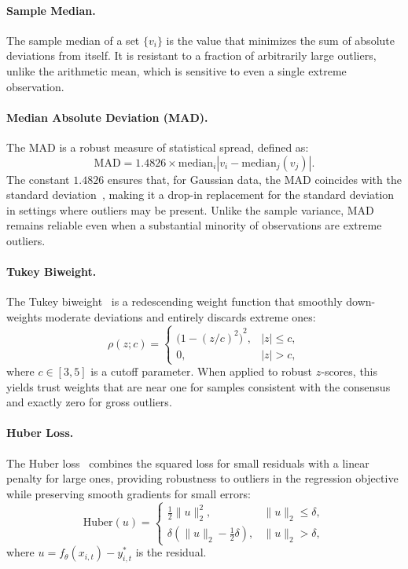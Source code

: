 \documentclass[a4paper, 10pt, conference]{ieeeconf}
\begin{document}
\paragraph{Sample Median.}
The sample median of a set $\{v_i\}$ is the value that minimizes the sum of absolute deviations from itself.
It is resistant to a fraction of arbitrarily large outliers, unlike the arithmetic mean, which is sensitive to even a single extreme observation.

\paragraph{Median Absolute Deviation (MAD).}
The MAD is a robust measure of statistical spread, defined as:
\begin{equation}
    \mathrm{MAD} = 1.4826 \times \mathrm{median}_i \left|v_i - \mathrm{median}_j(v_j)\right|.
\end{equation}
The constant $1.4826$ ensures that, for Gaussian data, the MAD coincides with the standard deviation~\cite{rousseeuw1993mad}, making it a drop-in replacement for the standard deviation in settings where outliers may be present.
Unlike the sample variance, MAD remains reliable even when a substantial minority of observations are extreme outliers.

\paragraph{Tukey Biweight.}
The Tukey biweight~\cite{kafadar1983biweight} is a redescending weight function that smoothly down-weights moderate deviations and entirely discards extreme ones:
\begin{equation}
    \rho(z; c) =
    \begin{cases}
        {\bigl(1 - {(z/c)}^2\bigr)}^2, & |z| \leq c, \\
        0, & |z| > c,
    \end{cases}
\end{equation}
where $c \in [3,5]$ is a cutoff parameter.
When applied to robust $z$-scores, this yields trust weights that are near one for samples consistent with the consensus and exactly zero for gross outliers.

\paragraph{Huber Loss.}
The Huber loss~\cite{huber1964robust} combines the squared loss for small residuals with a linear penalty for large ones, providing robustness to outliers in the regression objective while preserving smooth gradients for small errors:
\begin{equation}
    \mathrm{Huber}(u) =
    \begin{cases}
        \frac{1}{2}\|u\|_2^2, & \|u\|_2 \le \delta, \\
        \delta\!\left(\|u\|_2-\frac{1}{2}\delta\right), & \|u\|_2 > \delta,
    \end{cases}
\end{equation}
where $u = f_\theta(x_{i,t}) - y^*_{i,t}$ is the residual.
\end{document}
